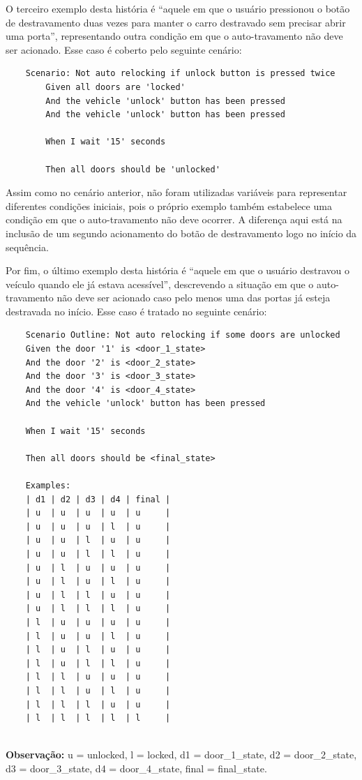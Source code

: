 O terceiro exemplo desta história é “aquele em que o usuário pressionou o botão de destravamento duas vezes para manter o carro destravado sem precisar abrir uma 
porta”, representando outra condição em que o auto-travamento não deve ser acionado. Esse caso é coberto pelo seguinte cenário:

\begin{verbatim}
    Scenario: Not auto relocking if unlock button is pressed twice
        Given all doors are 'locked'
        And the vehicle 'unlock' button has been pressed
        And the vehicle 'unlock' button has been pressed

        When I wait '15' seconds

        Then all doors should be 'unlocked'
\end{verbatim}

Assim como no cenário anterior, não foram utilizadas variáveis para representar diferentes condições iniciais, pois o próprio exemplo também estabelece uma condição 
em que o auto-travamento não deve ocorrer. A diferença aqui está na inclusão de um segundo acionamento do botão de destravamento logo no início da sequência.

Por fim, o último exemplo desta história é “aquele em que o usuário destravou o veículo quando ele já estava acessível”, descrevendo a situação em que o auto-travamento 
não deve ser acionado caso pelo menos uma das portas já esteja destravada no início. Esse caso é tratado no seguinte cenário:

\begin{verbatim}
    Scenario Outline: Not auto relocking if some doors are unlocked
    Given the door '1' is <door_1_state>
    And the door '2' is <door_2_state>
    And the door '3' is <door_3_state>
    And the door '4' is <door_4_state>
    And the vehicle 'unlock' button has been pressed
    
    When I wait '15' seconds
    
    Then all doors should be <final_state>
    
    Examples:
    | d1 | d2 | d3 | d4 | final |
    | u  | u  | u  | u  | u     |
    | u  | u  | u  | l  | u     |
    | u  | u  | l  | u  | u     |
    | u  | u  | l  | l  | u     |
    | u  | l  | u  | u  | u     |
    | u  | l  | u  | l  | u     |
    | u  | l  | l  | u  | u     |
    | u  | l  | l  | l  | u     |
    | l  | u  | u  | u  | u     |
    | l  | u  | u  | l  | u     |
    | l  | u  | l  | u  | u     |
    | l  | u  | l  | l  | u     |
    | l  | l  | u  | u  | u     |
    | l  | l  | u  | l  | u     |
    | l  | l  | l  | u  | u     |
    | l  | l  | l  | l  | l     |
    
\end{verbatim}
\noindent\textbf{Observação:} u = unlocked, l = locked, d1 = door\_1\_state, d2 = door\_2\_state, d3 = door\_3\_state, d4 = door\_4\_state, final = final\_state.

